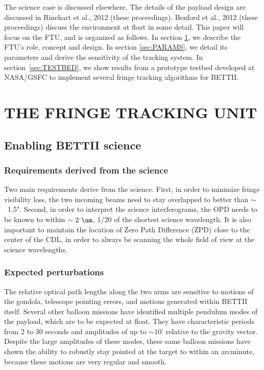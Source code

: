 The science case is discussed elsewhere\cite{Rinehart:2010p2318}. The details of the payload design are discussed in Rinehart et al., 2012 (these proceedings). Benford et al., 2012 (these proceedings) discuss the environment at float in some detail. This paper will focus on the FTU, and is organized as follows. In section \ref{sec:FTU}, we describe the FTU's role, concept and design. In section \ref{sec:PARAMS}, we detail its parameters and derive the sensitivity of the tracking system. In section~\ref{sec:TESTBED}, we show results from a prototype testbed developed at NASA/GSFC to implement several fringe tracking algorithms for BETTII.

\section{THE FRINGE TRACKING UNIT}\label{sec:FTU}

\subsection{Enabling BETTII science}
\subsubsection{Requirements derived from the science}
\label{subsubsec:Reqs}

Two main requirements derive from the science. First, in order to minimize fringe visibility loss, the two incoming beams need to stay overlapped to better than $\sim$~1.5". Second, in order to interpret the science interferograms, the OPD needs to be known to within $\sim 2~\um$, 1/20 of the shortest science wavelength. It is also important to maintain the location of Zero Path Difference (ZPD) close to the center of the CDL, in order to always be scanning the whole field of view at the science wavelengths.

\subsubsection{Expected perturbations}
The relative optical path lengths along the two arms are sensitive to motions of the gondola, telescope pointing errors, and motions generated within BETTII itself. Several other balloon missions \citep{Fixsen:1996kha} have identified multiple pendulum modes of the payload, which are to be expected at float. They have characteristic periods from 2 to 30 seconds and amplitudes of up to $\sim 10$' relative to the gravity vector. Despite the large amplitudes of these modes, these same balloon missions have shown the ability to robustly stay pointed at the target to within an arcminute, because these motions are very regular and smooth.

